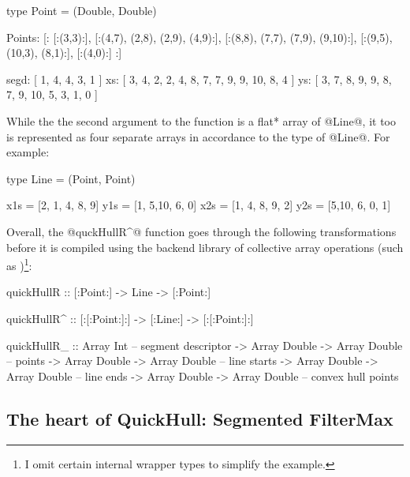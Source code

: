 \documentclass[preamble.tex]{subfiles}
\begin{document}
\begin{hscode}
type Point = (Double, Double)

Points:
  [:
     [:(3,3):],
     [:(4,7), (2,8),  (2,9), (4,9):],
     [:(8,8), (7,7),  (7,9), (9,10):],
     [:(9,5), (10,3), (8,1):],
     [:(4,0):]
  :]


segd: [ 1, 4, 4, 3, 1 ]
xs:   [ 3, 4, 2, 2, 4, 8, 7, 7,  9, 9, 10, 8, 4 ]
ys:   [ 3, 7, 8, 9, 9, 8, 7, 9, 10, 5,  3, 1, 0 ]
\end{hscode}


While the the second argument to the function is a \*flat* array of @Line@, it too is represented as four separate arrays in accordance to the type of @Line@. For example:


\begin{hscode}
type Line = (Point, Point)

x1s = [2, 1, 4, 8, 9]
y1s = [1, 5,10, 6, 0]
x2s = [1, 4, 8, 9, 2]
y2s = [5,10, 6, 0, 1]
\end{hscode}


Overall, the @quckHullR^@ function goes through the following transformations before it is compiled using the backend library of collective array operations (such as \LiveFusion)\footnote{I omit certain internal wrapper types to simplify the example.}:

\begin{hscode}[literate={^}{{$^\uparrow$}}1,]
quickHullR  :: [:Point:] -> Line -> [:Point:]


quickHullR^ :: [:[:Point:]:] -> [:Line:] -> [:[:Point:]:]


quickHullR_ :: Array Int                      -- segment descriptor
            -> Array Double -> Array Double   -- points
            -> Array Double -> Array Double   -- line starts
            -> Array Double -> Array Double   -- line ends            
            -> Array Double -> Array Double   -- convex hull points
\end{hscode}



\subsection{The heart of QuickHull: Segmented FilterMax}
\label{sec:FilterMax}
\end{document}
